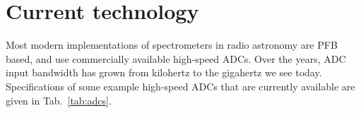 \documentclass{ws-rv961x669}
\begin{document}





\section{Current technology}

Most modern implementations of spectrometers in radio astronomy are PFB based, and use commercially available high-speed ADCs. Over the years, ADC input bandwidth has grown from kilohertz to the gigahertz we see today. Specifications of some example high-speed ADCs that are currently available are given in Tab.~\ref{tab:adcs}. 
\end{document}
